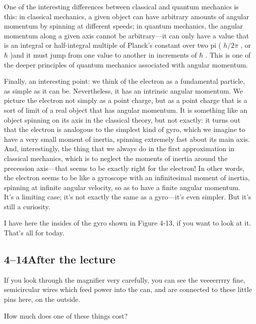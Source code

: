 \documentclass[11pt,oneside]{article}
\begin{document}
One of the interesting differences between classical and quantum mechanics is this: in classical mechanics, a given object can have arbitrary amounts of angular momentum by spinning at different speeds; in quantum mechanics, the angular momentum along a given axis cannot be arbitrary---it can only have a value that is an integral or half-integral multiple of Planck's constant over two pi ( \(h/2\pi\) , or \(\hbar\) )and it must jump from one value to another in increments of \(\hbar\) . This is one of the deeper principles of quantum mechanics associated with angular momentum.\par

Finally, an interesting point: we think of the electron as a fundamental particle, as simple as it can be. Nevertheless, it has an intrinsic angular momentum. We picture the electron not simply as a point charge, but as a point charge that is a sort of limit of a real object that has angular momentum. It is something like an object spinning on its axis in the classical theory, but not exactly: it turns out that the electron is analogous to the simplest kind of gyro, which we imagine to have a very small moment of inertia, spinning extremely fast about its main axis. And, interestingly, the thing that we always do in the first approximation in classical mechanics, which is to neglect the moments of inertia around the precession axis---that seems to be exactly right for the electron! In other words, the electron seems to be like a gyroscope with an infinitesimal moment of inertia, spinning at infinite angular velocity, so as to have a finite angular momentum. It's a limiting case; it's not exactly the same as a gyro---it's even simpler. But it's still a curiosity.\par

I have here the insides of the gyro shown in Figure 4-13, if you want to look at it. That's all for today.\par

\subsection*{4--14After the lecture}

If you look through the magnifier very carefully, you can see the veeeerrrry fine, semicircular wires which feed power into the can, and are connected to these little pins here, on the outside.\par

How much does one of these things cost?\par
\end{document}
